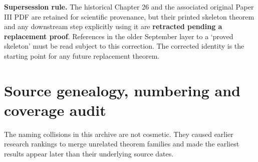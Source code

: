 \documentclass[
  10pt,
  a4paper,
  10pt,
  oneside,
  openany]{book}
\begin{document}
\textbf{Supersession rule.} The historical Chapter 26 and the associated
original Paper III PDF are retained for scientific provenance, but their
printed skeleton theorem and any downstream step explicitly using it are
\textbf{retracted pending a replacement proof}. References in the older
September layer to a `proved skeleton' must be read subject to this
correction. The corrected identity is the starting point for any future
replacement theorem.

\section{Source genealogy, numbering and coverage
audit}\label{atlas-source-genealogy}

The naming collisions in this archive are not cosmetic. They caused
earlier research rankings to merge unrelated theorem families and made
the earliest results appear later than their underlying source dates.
\end{document}
